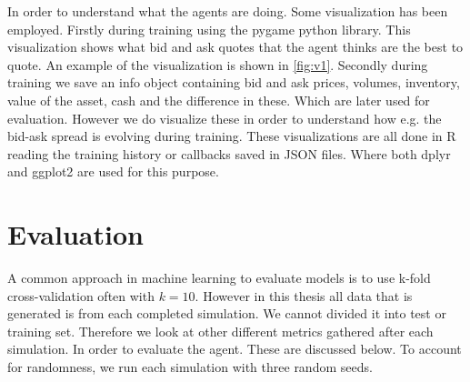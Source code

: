 \documentclass{kththesis}
\theoremstyle{definition}
\begin{document}
In order to understand what the agents are doing. Some visualization has been employed. Firstly during training using the pygame python library. This visualization shows what bid and ask quotes that the agent thinks are the best to quote. An example of the visualization is shown in \autoref{fig:v1}. 
\newline
\newline
Secondly during training we save an info object containing bid and ask prices, volumes, inventory, value of the asset, cash and the difference in these. Which are later used for evaluation. However we do visualize these in order to understand how e.g. the bid-ask spread is evolving during training. These visualizations are all done in R reading the training history or callbacks saved in JSON files. Where both dplyr \parencite{dplyr} and ggplot2 \parencite{ggfplot2} are used for this purpose.

\section{Evaluation}
A common approach in machine learning to evaluate models is to use k-fold cross-validation often with $k=10$. However in this thesis all data that is generated is from each completed simulation. We cannot divided it into test or training set. Therefore we look at other different metrics gathered after each simulation. In order to evaluate the agent. These are discussed below. To account for randomness, we run each simulation with three random seeds. 
\end{document}
